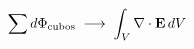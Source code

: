 \documentclass[preview]{standalone}
\begin{document}
\begin{align*}
\special{dvisvgm:raw <g id='unique000'>}\sum d\Phi_{\rm cubos}\;\longrightarrow\;\int_V\nabla\cdot\mathbf E\,dV\special{dvisvgm:raw </g>}
\end{align*}
\end{document}
